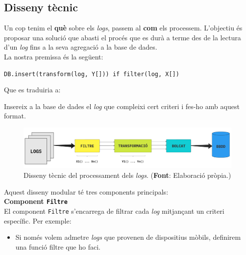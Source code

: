 \clearpage

\subsection{Disseny tècnic}\label{subsec:logs-technical-design}

Un cop tenim el \textbf{què} sobre els \textit{\gls{log}s}, passem al \textbf{com} els processem.
L'objectiu és proposar una solució que abasti el procés que es durà a terme des de la lectura d’un \textit{\gls{log}} fins a la seva agregació a la base de dades. \\

\noindent
La nostra premissa és la següent:
\noindent
\begin{center}
    \texttt{DB.insert(transform(log, Y[])) if filter(log, X[])}
\end{center}

\noindent
Que es traduiria a:
\begin{center}
    Insereix a la base de dades el \textit{\gls{log}} que compleixi cert criteri i fes-ho amb aquest format.
\end{center}

\begin{figure}[htbp]
    \centerline{\includegraphics[width=1\textwidth]{figures/log-processing}}
    \captionsetup{justification=centering}
    \caption{Disseny tècnic del processament dels \textit{logs}. (\textbf{Font}: Elaboració pròpia.)}\label{fig:log-processing}
\end{figure}

\noindent
Aquest disseny modular té tres components principals: \\

\noindent
\textbf{Component \texttt{Filtre}} \\

\noindent
El component \texttt{Filtre} s’encarrega de filtrar cada \textit{\gls{log}} mitjançant un criteri específic.
Per exemple:
\begin{itemize}
    \item Si només volem admetre \textit{\gls{log}s} que provenen de dispositius mòbils, definirem una funció filtre que ho faci.
\end{itemize}

